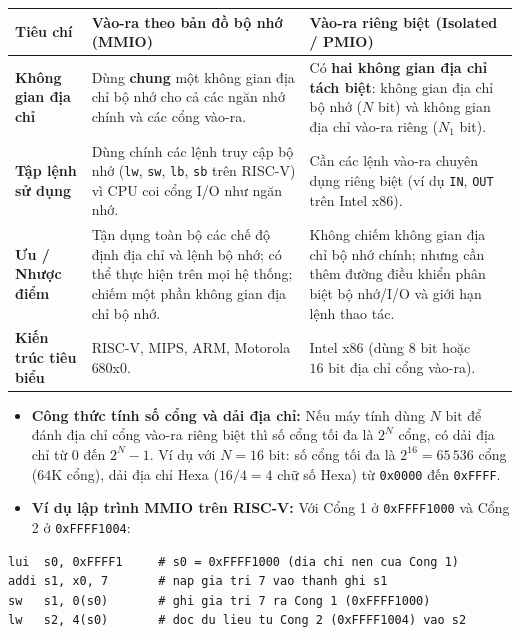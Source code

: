 \begin{tcolorbox}[bwbox, title={So sánh Vào-ra theo bản đồ bộ nhớ (MMIO) và Vào-ra riêng biệt (Isolated I/O)}]
\begin{center}
\renewcommand{\arraystretch}{1.25}
\small
\begin{tabularx}{\linewidth}{|L{3.0cm}|Y|Y|}
\hline
\textbf{Tiêu chí} & \textbf{Vào-ra theo bản đồ bộ nhớ (MMIO)} & \textbf{Vào-ra riêng biệt (Isolated / PMIO)} \\ \hline
\textbf{Không gian địa chỉ} & Dùng \textbf{chung} một không gian địa chỉ bộ nhớ cho cả các ngăn nhớ chính và các cổng vào-ra. & Có \textbf{hai không gian địa chỉ tách biệt}: không gian địa chỉ bộ nhớ ($N$ bit) và không gian địa chỉ vào-ra riêng ($N_1$ bit). \\ \hline
\textbf{Tập lệnh sử dụng} & Dùng chính các lệnh truy cập bộ nhớ (\texttt{lw}, \texttt{sw}, \texttt{lb}, \texttt{sb} trên RISC-V) vì CPU coi cổng I/O như ngăn nhớ. & Cần các lệnh vào-ra chuyên dụng riêng biệt (ví dụ \texttt{IN}, \texttt{OUT} trên Intel x86). \\ \hline
\textbf{Ưu / Nhược điểm} & Tận dụng toàn bộ các chế độ định địa chỉ và lệnh bộ nhớ; có thể thực hiện trên mọi hệ thống; chiếm một phần không gian địa chỉ bộ nhớ. & Không chiếm không gian địa chỉ bộ nhớ chính; nhưng cần thêm đường điều khiển phân biệt bộ nhớ/I/O và giới hạn lệnh thao tác. \\ \hline
\textbf{Kiến trúc tiêu biểu} & RISC-V, MIPS, ARM, Motorola 680x0. & Intel x86 (dùng $8\text{ bit}$ hoặc $16\text{ bit}$ địa chỉ cổng vào-ra). \\ \hline
\end{tabularx}
\end{center}
\end{tcolorbox}

\begin{itemize}
    \item \textbf{Công thức tính số cổng và dải địa chỉ:} Nếu máy tính dùng $N\text{ bit}$ để đánh địa chỉ cổng vào-ra riêng biệt thì số cổng tối đa là $2^N$ cổng, có dải địa chỉ từ $0$ đến $2^N - 1$. Ví dụ với $N = 16\text{ bit}$: số cổng tối đa là $2^{16} = 65\,536$ cổng ($64\text{K}$ cổng), dải địa chỉ Hexa ($16 / 4 = 4$ chữ số Hexa) từ \texttt{0x0000} đến \texttt{0xFFFF}.
    \item \textbf{Ví dụ lập trình MMIO trên RISC-V:} Với Cổng 1 ở \texttt{0xFFFF1000} và Cổng 2 ở \texttt{0xFFFF1004}:
\end{itemize}

\begin{lstlisting}
lui  s0, 0xFFFF1     # s0 = 0xFFFF1000 (dia chi nen cua Cong 1)
addi s1, x0, 7       # nap gia tri 7 vao thanh ghi s1
sw   s1, 0(s0)       # ghi gia tri 7 ra Cong 1 (0xFFFF1000)
lw   s2, 4(s0)       # doc du lieu tu Cong 2 (0xFFFF1004) vao s2
\end{lstlisting}

